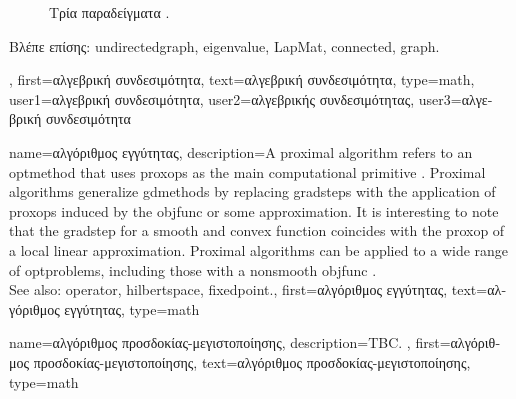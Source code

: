 {{\begin{figure}[H]
		{
		\caption{\foreignlanguage{greek}{Τρία παραδείγματα} . \label{fig_algconn_dict}} }
		\end{figure}
		\foreignlanguage{greek}{Βλέπε επίσης:} \gls{undirectedgraph}, \gls{eigenvalue}, \gls{LapMat}, \gls{connected}, \gls{graph}.},
	first={\foreignlanguage{greek}{αλγεβρική συνδεσιμότητα}},
	text={\foreignlanguage{greek}{αλγεβρική συνδεσιμότητα}},
	type=math,
	user1={\foreignlanguage{greek}{αλγεβρική συνδεσιμότητα}}, %
  	user2={\foreignlanguage{greek}{αλγεβρικής συνδεσιμότητας}}, %
	user3={\foreignlanguage{greek}{αλγεβρική συνδεσιμότητα}} %
}

{name={\foreignlanguage{greek}{αλγόριθμος εγγύτητας}},
	description={A proximal \gls{algorithm} refers to an \gls{optmethod} 
		that uses \glspl{proxop} as the main computational primitive \cite{ProximalMethods}. 
		Proximal \glspl{algorithm} generalize \glspl{gdmethod} by replacing 
		\glspl{gradstep} with the application of \glspl{proxop} induced 
		by the \gls{objfunc} or some approximation. 
		It is interesting to note that the \gls{gradstep} for a \gls{smooth} 
		and \gls{convex} \gls{function} coincides with the \gls{proxop} 
		of a local linear approximation. Proximal \glspl{algorithm} can 
		be applied to a wide range of \glspl{optproblem}, including those 
		with a \gls{nonsmooth} \gls{objfunc} \cite{ProximalMethods}.
		\\
		See also: \gls{operator}, \gls{hilbertspace}, \gls{fixedpoint}.},
	first={\foreignlanguage{greek}{αλγόριθμος εγγύτητας}},
	text={\foreignlanguage{greek}{αλγόριθμος εγγύτητας}},
	type=math
}%

{name={\foreignlanguage{greek}{αλγόριθμος προσδοκίας-μεγιστοποίησης}}, 
	description={TBC. },
	first={\foreignlanguage{greek}{αλγόριθμος προσδοκίας-μεγιστοποίησης}},
	text={\foreignlanguage{greek}{αλγόριθμος προσδοκίας-μεγιστοποίησης}},
	type=math
}%


